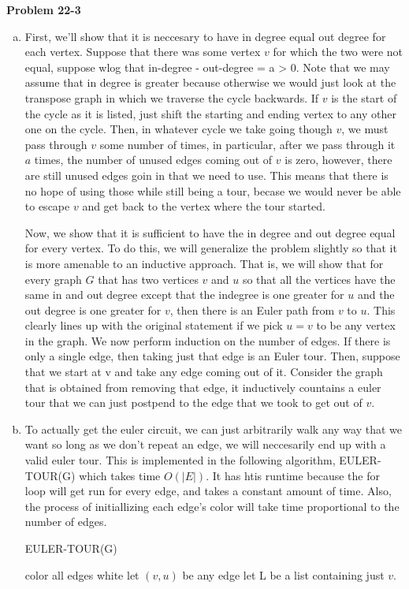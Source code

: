 \documentclass{article}
\begin{document}
\noindent\textbf{Problem 22-3}\\
\begin{enumerate}[a)]
\item
First, we'll show that it is neccesary to have in degree equal out degree for each vertex. Suppose that there was some vertex $v$ for which the two were not equal, suppose wlog that in-degree - out-degree = a > 0. Note that we may assume that in degree is greater because otherwise we would just look at the transpose graph in which we traverse the cycle backwards. If $v$ is the start of the cycle as it is listed, just shift the starting and ending vertex to any other one on the cycle. Then, in whatever cycle we take going though $v$, we must pass through $v$ some number of times, in particular, after we pass through it $a$ times, the number of unused edges coming out of $v$ is zero, however, there are still unused edges goin in that we need to use. This means that there is no hope of using those while still being a tour, becase we would never be able to escape $v$ and get back to the vertex where the tour started.

Now, we show that it is sufficient to have the in degree and out degree equal for every vertex. To do this, we will generalize the problem slightly so that it is more amenable to an inductive approach. That is, we will show that for every graph $G$ that has two vertices $v$ and $u$ so that all the vertices have the same in and out degree except that the indegree is one greater for $u$ and the out degree is one greater for $v$, then there is an Euler path from $v$ to $u$. This clearly lines up with the original statement if we pick $u=v$ to be any vertex in the graph. We now perform induction on the number of edges. If there is only a single edge, then taking just that edge is an Euler tour. Then, suppose that we start at v and take any edge coming out of it. Consider the graph that is obtained from removing that edge, it inductively countains a euler tour that we can just postpend to the edge that we took to get out of $v$.\\

\item
To actually get the euler circuit, we can just arbitrarily walk any way that we want so long as we don't repeat an edge, we will neccesarily end up with a valid euler tour. This is implemented in the following algorithm, EULER-TOUR(G) which takes time $O(|E|)$. It has htis runtime because the for loop will get run for every edge, and takes a constant amount of time. Also, the process of initiallizing each edge's color will take time proportional to the number of edges.
\begin{algorithm}
\caption{EULER-TOUR(G)}
\begin{algorithmic}
\State color all edges white
\State let $(v,u)$ be any edge
\State let L be a list containing just $v$.
\EndWhile
\end{algorithmic}
\end{algorithm}



\end{enumerate}
\end{document}
